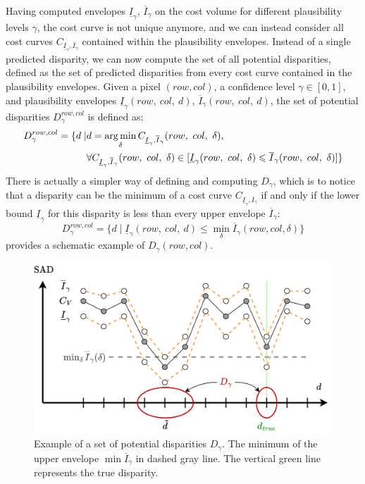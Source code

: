 Having computed envelopes $\underline{I}_\gamma$, $\overline{I}_\gamma$ on the cost volume for different plausibility levels $\gamma$, the cost curve is not unique anymore, and we can instead consider all cost curves $C_{\underline{I}_\gamma,\overline{I}_\gamma}$ contained within the plausibility envelopes. Instead of a single predicted disparity, we can now compute the set of all potential disparities, defined as the set of predicted disparities from every cost curve contained in the plausibility envelopes. Given a pixel $(row, col)$, a confidence level $\gamma \in [0, 1]$, and plausibility envelopes $\underline{I}_\gamma(row, ~col, ~d)$, $\overline{I}_\gamma(row, ~col, ~d)$, the set of potential disparities $D_\gamma^{row, col}$ is defined as:
\begin{align}
    D_\gamma^{row, col} = \{d \mid& d=\operatorname*{arg\,min}_\delta C_{\underline{I}_\gamma,\overline{I}_\gamma}(row,~col,~\delta),\\
    &\forall C_{\underline{I}_\gamma,\overline{I}_\gamma}(row, ~col, ~\delta)\in[\underline{I}_\gamma(row, ~col, ~\delta)\leqslant \overline{I}_\gamma(row, ~col, ~\delta)]\}\nonumber
\end{align}
There is actually a simpler way of defining and computing $D_\gamma$, which is to notice that a disparity can be the minimum of a cost curve $C_{\underline{I}_\gamma,\overline{I}_\gamma}$ if and only if the lower bound $\underline{I}_\gamma$ for this disparity is less than every upper envelope $\overline{I}_\gamma$:
\begin{equation}
    D_\gamma^{row, col} = \{d \mid \underline{I}_\gamma(row, ~col, ~d) \leq \min_\delta\overline{I}_\gamma(row, col, \delta)\}
\end{equation}
 provides a schematic example of $D_\gamma(row, col)$.
\begin{figure}[ht]
    \centering
    \includegraphics[width=\linewidth]{Images/Chap_4/Potentiel_disparities.png}
    \caption{Example of a set of potential disparities $D_\gamma$. The minimum of the upper envelope $\min\overline{I}_\gamma$ in dashed gray line. The vertical green line represents the true disparity.}
    \label{fig:potential_disparities}
\end{figure}

